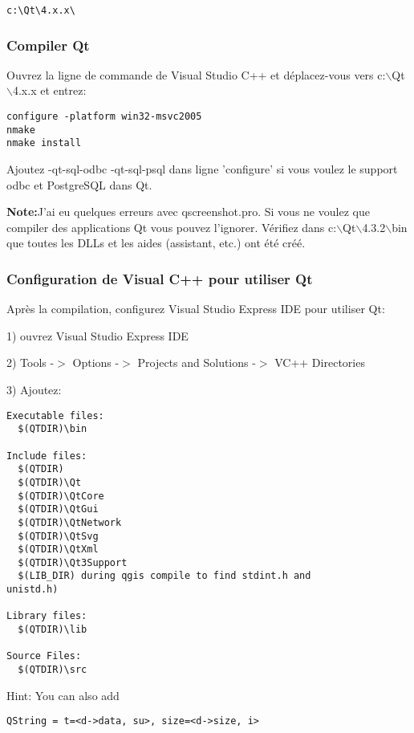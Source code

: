 \begin{verbatim}
c:\Qt\4.x.x\
\end{verbatim}

\subsubsection{Compiler Qt}
Ouvrez la ligne de commande de Visual Studio C++ et déplacez-vous vers c:$\backslash$Qt$\backslash$4.x.x et entrez:

\begin{verbatim}
configure -platform win32-msvc2005
nmake
nmake install
\end{verbatim}

Ajoutez -qt-sql-odbc -qt-sql-psql dans ligne  'configure' si vous voulez le support odbc et PostgreSQL dans Qt.

\textbf{Note:}J'ai eu quelques erreurs avec qscreenshot.pro. Si vous ne voulez que compiler des applications Qt vous pouvez l'ignorer. Vérifiez dans c:$\backslash$Qt$\backslash$4.3.2$\backslash$bin que toutes les DLLs et les aides (assistant, etc.) ont été créé.

\subsubsection{Configuration de Visual C++ pour utiliser Qt}
Après la compilation, configurez Visual Studio Express IDE pour utiliser Qt:

1) ouvrez Visual Studio Express IDE

2) Tools -$>$ Options -$>$ Projects and Solutions -$>$ VC++ Directories

3) Ajoutez:

\begin{verbatim}
Executable files: 
  $(QTDIR)\bin

Include files: 
  $(QTDIR)
  $(QTDIR)\Qt
  $(QTDIR)\QtCore
  $(QTDIR)\QtGui
  $(QTDIR)\QtNetwork
  $(QTDIR)\QtSvg
  $(QTDIR)\QtXml
  $(QTDIR)\Qt3Support
  $(LIB_DIR) during qgis compile to find stdint.h and
unistd.h)

Library files: 
  $(QTDIR)\lib

Source Files:
  $(QTDIR)\src
\end{verbatim}

Hint:  You can also add

\begin{verbatim}
QString = t=<d->data, su>, size=<d->size, i>
\end{verbatim}

